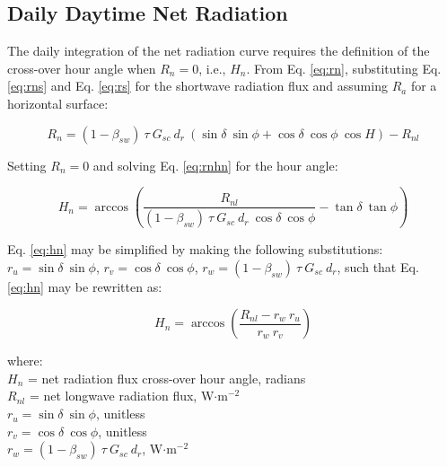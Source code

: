 \subsection{Daily Daytime Net Radiation}
\label{sec:drn}
The daily integration of the net radiation curve requires the definition of the cross-over hour angle when $R_n = 0$, i.e., $H_n$. 
From Eq. \ref{eq:rn}, substituting Eq. \ref{eq:rns} and Eq. \ref{eq:rs} for the shortwave radiation flux and assuming $R_a$ for a horizontal surface:

\begin{equation}
\label{eq:rnhn}
	R_{n} = \left(1-\beta_{sw}\right)\:\tau\: G_{sc}\: d_r\: \left(
	        \sin\delta\: \sin\phi + 
	        \cos\delta\: \cos\phi\: \cos H
	        \right) - R_{nl}
\end{equation}

\noindent Setting $R_n = 0$ and solving Eq. \ref{eq:rnhn} for the hour angle:

\begin{equation}
\label{eq:hn}
	H_{n} = \arccos \left( 
	        \frac{R_{nl}}{\left(1-\beta_{sw}\right)\:\tau\: G_{sc}\: d_r\: 
	        \cos\delta\: \cos\phi} - 
	        \tan\delta\: \tan\phi
	        \right)
\end{equation}

\noindent Eq. \ref{eq:hn} may be simplified by making the following substitutions: $r_u = \sin\delta\:\sin\phi$, $r_v = \cos\delta\:\cos\phi$, $r_w = \left(1-\beta_{sw}\right)\:\tau\: G_{sc}\: d_r$, such that Eq. \ref{eq:hn} may be rewritten as:

\begin{equation}
\label{eq:hns}
	H_{n} = \arccos \left( 
	        \frac{R_{nl} - r_w\: r_u}{r_w\: r_v} 
	        \right)
\end{equation}

\noindent where:\\
\indent $H_n$ = net radiation flux cross-over hour angle, radians\\
\indent $R_{nl}$ = net longwave radiation flux, W$\cdot$m$^{-2}$\\
\indent $r_u = \sin\delta\: \sin\phi$, unitless \\
\indent $r_v = \cos\delta\: \cos\phi$, unitless \\
\indent $r_w = \left(1-\beta_{sw}\right)\:\tau\: G_{sc}\: d_r$, W$\cdot$m$^{-2}$\\

